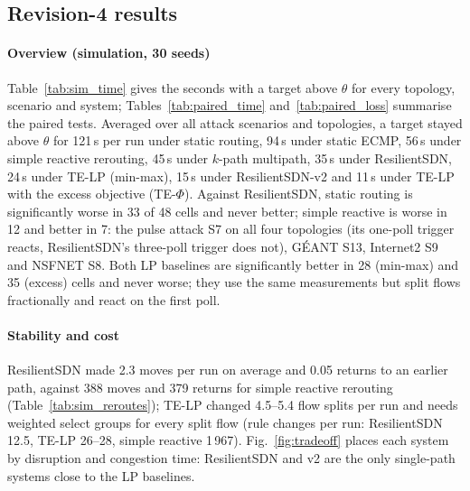 \subsection{Revision-4 results}\label{sec:results}



\paragraph{Overview (simulation, 30 seeds)}
Table~\ref{tab:sim_time} gives the seconds with a target above $\theta$ for every topology,
scenario and system; Tables~\ref{tab:paired_time} and~\ref{tab:paired_loss} summarise the paired
tests. Averaged over all attack scenarios and topologies, a target stayed above $\theta$ for
121\,s per run under static routing, 94\,s under static ECMP, 56\,s under simple reactive
rerouting, 45\,s under $k$-path multipath, 35\,s under ResilientSDN, 24\,s under TE-LP (min-max),
15\,s under ResilientSDN-v2 and 11\,s under TE-LP with the excess objective (TE-$\Phi$). Against
ResilientSDN, static routing is significantly worse in 33 of 48 cells and never better; simple
reactive is worse in 12 and better in 7: the pulse attack S7 on all four topologies (its one-poll
trigger reacts, ResilientSDN's three-poll trigger does not), G\'EANT S13, Internet2 S9 and NSFNET S8. Both LP baselines are significantly better in 28 (min-max)
and 35 (excess) cells and never worse; they use the same measurements but split flows fractionally
and react on the first poll.






\paragraph{Stability and cost}
ResilientSDN made 2.3 moves per run on average and 0.05 returns to an earlier path, against 388
moves and 379 returns for simple reactive rerouting (Table~\ref{tab:sim_reroutes}); TE-LP changed
4.5--5.4 flow splits per run and needs weighted select groups for every split flow
(rule changes per run: ResilientSDN 12.5, TE-LP 26--28, simple reactive 1\,967). Fig.~\ref{fig:tradeoff}
places each system by disruption and congestion time: ResilientSDN and v2 are the only single-path
systems close to the LP baselines.

